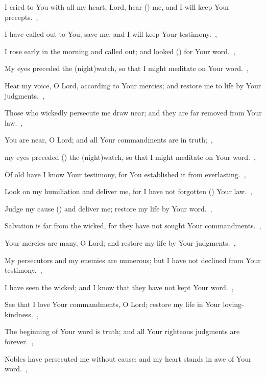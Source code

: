 \documentclass[12pt,twoside,a5paper]{article}
\begin{document}
\begin{normalparskip}
   I cried to You with all my heart, Lord, hear () me, and I will keep Your precepts.~\sep


  I have called out to You; save me, and I will keep Your testimony.~\sep

  I rose early in the morning and called out; and looked () for Your word.~\sep

  My eyes preceded the (night)watch, so that I might meditate on Your word.~\sep

  Hear my voice, O Lord, according to Your mercies; and restore me to life by Your judgments.~\sep

  Those who wickedly persecute me draw near; and they are far removed from Your law.~\sep

  You are near, O Lord; and all Your commandments are in truth;~\sep

  my eyes preceded () the (night)watch, so that I might meditate on Your word.~\sep

  Of old have I know Your testimony, for You established it from everlasting.~\sep

   Look on my humiliation and deliver me, for I have not forgotten () Your law.~\sep


  Judge my cause () and deliver me; restore my life by Your word.~\sep

  Salvation is far from the wicked, for they have not sought Your commandments.~\sep

  Your mercies are many, O Lord; and restore my life by Your judgments.~\sep

  My persecutors and my enemies are numerous; but I have not declined from Your testimony.~\sep

  I have seen the wicked; and I know that they have not kept Your word.~\sep

  See that I love Your commandments, O Lord; restore my life in Your loving-kindness.~\sep

  The beginning of Your word is truth; and all Your righteous judgments are forever.~\sep

   Nobles have persecuted me without cause; and my heart stands in awe of Your word.~\sep


\end{normalparskip}
\end{document}
